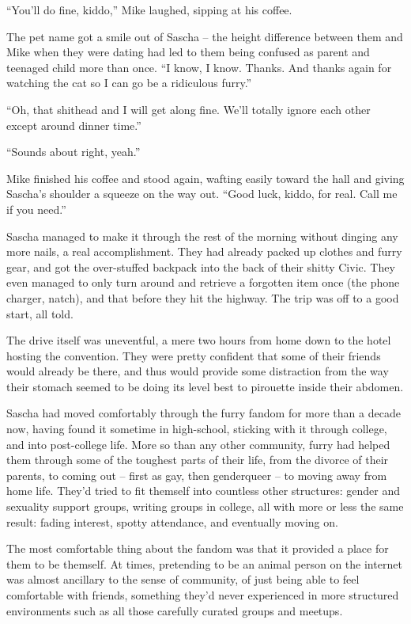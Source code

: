 ``You'll do fine, kiddo,'' Mike laughed, sipping at his coffee.

The pet name got a smile out of Sascha -- the height difference between them and Mike when they were dating had led to them being confused as parent and teenaged child more than once. ``I know, I know. Thanks. And thanks again for watching the cat so I can go be a ridiculous furry.''

``Oh, that shithead and I will get along fine. We'll totally ignore each other except around dinner time.''

``Sounds about right, yeah.''

Mike finished his coffee and stood again, wafting easily toward the hall and giving Sascha's shoulder a squeeze on the way out. ``Good luck, kiddo, for real. Call me if you need.''

\secdiv

Sascha managed to make it through the rest of the morning without dinging any more nails, a real accomplishment. They had already packed up clothes and furry gear, and got the over-stuffed backpack into the back of their shitty Civic. They even managed to only turn around and retrieve a forgotten item once (the phone charger, natch), and that before they hit the highway. The trip was off to a good start, all told.

The drive itself was uneventful, a mere two hours from home down to the hotel hosting the convention. They were pretty confident that some of their friends would already be there, and thus would provide some distraction from the way their stomach seemed to be doing its level best to pirouette inside their abdomen.

Sascha had moved comfortably through the furry fandom for more than a decade now, having found it sometime in high-school, sticking with it through college, and into post-college life. More so than any other community, furry had helped them through some of the toughest parts of their life, from the divorce of their parents, to coming out -- first as gay, then genderqueer -- to moving away from home life. They'd tried to fit themself into countless other structures: gender and sexuality support groups, writing groups in college, all with more or less the same result: fading interest, spotty attendance, and eventually moving on.

The most comfortable thing about the fandom was that it provided a place for them to be themself. At times, pretending to be an animal person on the internet was almost ancillary to the sense of community, of just being able to feel comfortable with friends, something they'd never experienced in more structured environments such as all those carefully curated groups and meetups.

